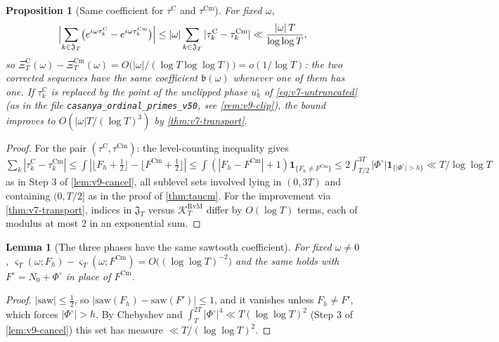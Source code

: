 \documentclass[11pt,a4paper]{article}
\numberwithin{equation}{section}
\newtheorem{proposition}[theorem]{Proposition}
\newtheorem{lemma}[theorem]{Lemma}
\theoremstyle{definition}
\theoremstyle{remark}
\newcommand{\ind}{\mathbf 1}
\newcommand{\Cm}{\mathrm{Cm}}
\begin{document}
\begin{proposition}[Same coefficient for $\tau^{\mathrm C}$ and $\tau^{\Cm}$]\label{prop:v9-CvsCm}
For fixed $\omega$,
\begin{equation}
\Bigl|\sum_{k\in\mathfrak J_T}\bigl(e^{i\omega\tau_k^{\mathrm C}}-e^{i\omega\tau_k^{\Cm}}\bigr)\Bigr|\le|\omega|\sum_{k\in\mathfrak J_T}|\tau_k^{\mathrm C}-\tau_k^{\Cm}|\ll\frac{|\omega|\,T}{\log\log T},
\end{equation}
so $\Xi_T^{\mathrm C}(\omega)-\Xi_T^{\Cm}(\omega)=O\bigl(|\omega|/(\log T\log\log T)\bigr)=o(1/\log T)$: the two corrected sequences have the same coefficient $\mathfrak b(\omega)$ whenever one of them has one. If $\tau_k^{\mathrm C}$ is replaced by the point of the unclipped phase $u_k^\circ$ of \eqref{eq:v7-untruncated} (as in the file \texttt{casanya\_ordinal\_primes\_v50}, see \cref{rem:v9-clip}), the bound improves to $O(|\omega|T/(\log T)^3)$ by \cref{thm:v7-transport}.
\end{proposition}
\begin{proof}
For the pair $(\tau^{\mathrm C},\tau^{\Cm})$: the level-counting inequality gives $\sum_k|\tau_k^{\mathrm C}-\tau_k^{\Cm}|\le\int|\lfloor F_h+\frac12\rfloor-\lfloor F^{\Cm}+\frac12\rfloor|\le\int(|F_h-F^{\Cm}|+1)\ind_{\{F_h\ne F^{\Cm}\}}\le2\int_{T/2}^{3T}|\Phi^\circ|\ind_{\{|\Phi^\circ|>h\}}\ll T/\log\log T$ as in Step 3 of \cref{lem:v9-cancel}, all sublevel sets involved lying in $(0,3T)$ and containing $(0,T/2]$ as in the proof of \cref{thm:taucm}. For the improvement via \cref{thm:v7-transport}, indices in $\mathfrak J_T$ versus $\mathcal K_T^{\mathrm{RvM}}$ differ by $O(\log T)$ terms, each of modulus at most $2$ in an exponential sum.
\end{proof}

\begin{lemma}[The three phases have the same sawtooth coefficient]\label{lem:v9-sawcmp}
For fixed $\omega\ne0$, $\varsigma_T(\omega;F_h)-\varsigma_T(\omega;F^{\Cm})=O\bigl((\log\log T)^{-2}\bigr)$ and the same holds with $F^{\circ}=N_0+\Phi^\circ$ in place of $F^{\Cm}$.
\end{lemma}
\begin{proof}
$|\mathrm{saw}|\le\frac12$, so $|\mathrm{saw}(F_h)-\mathrm{saw}(F')|\le1$, and it vanishes unless $F_h\ne F'$, which forces $|\Phi^\circ|>h$. By Chebyshev and $\int_T^{2T}|\Phi^\circ|^4\ll T(\log\log T)^2$ (Step 3 of \cref{lem:v9-cancel}) this set has measure $\ll T/(\log\log T)^2$.
\end{proof}
\end{document}
